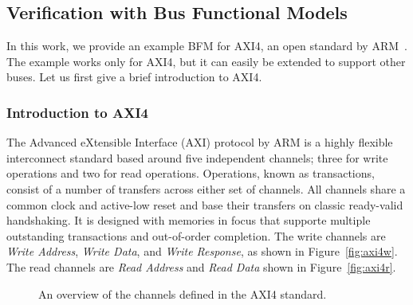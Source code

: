\documentclass[conference]{IEEEtran}
\begin{document}
\subsection{Verification with Bus Functional Models}
In this work, we provide an example BFM for AXI4, an open standard by ARM~\cite{axi4standard}. The example works only for AXI4, but it can easily be extended to support other buses. Let us first give a brief introduction to AXI4.

\subsubsection{Introduction to AXI4}
The Advanced eXtensible Interface (AXI) protocol by ARM is a highly flexible interconnect standard based around five independent channels; three for write operations and two for read operations. Operations, known as transactions, consist of a number of transfers across either set of channels. All channels share a common clock and active-low reset and base their transfers on classic ready-valid handshaking. It is designed with memories in focus that supporte multiple outstanding transactions and out-of-order completion. The write channels are \textit{Write Address}, \textit{Write Data}, and \textit{Write Response}, as shown in Figure~\ref{fig:axi4w}. The read channels are \textit{Read Address} and \textit{Read Data} shown in Figure~\ref{fig:axi4r}.

\begin{figure}[t]
  \centering
  \hfill
  \label{fig:axi4}
  \caption{An overview of the channels defined in the AXI4 standard.}
\end{figure}
\end{document}
